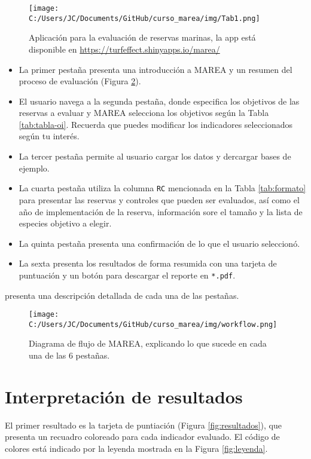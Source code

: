 \documentclass[]{krantz}
\providecommand{\tightlist}{%
  \setlength{\itemsep}{0pt}\setlength{\parskip}{0pt}}
\begin{document}
\begin{figure}
\centering
\texttt{[image: C:/Users/JC/Documents/GitHub/curso\_marea/img/Tab1.png]}
\caption{\label{fig:shiny-marea}Aplicación para la evaluación de reservas
marinas, la app está disponible en
\url{https://turfeffect.shinyapps.io/marea/}}
\end{figure}

\begin{itemize}
\tightlist
\item
  La primer pestaña presenta una introducción a MAREA y un resumen del
  proceso de evaluación (Figura \ref{fig:workflow}).
\item
  El usuario navega a la segunda pestaña, donde especifica los objetivos
  de las reservas a evaluar y MAREA selecciona los objetivos según la
  Tabla \ref{tab:tabla-oi}. Recuerda que puedes modificar los
  indicadores seleccionados según tu interés.
\item
  La tercer pestaña permite al usuario cargar los datos y dercargar
  bases de ejemplo.
\item
  La cuarta pestaña utiliza la columna \texttt{RC} mencionada en la
  Tabla \ref{tab:formato} para presentar las reservas y controles que
  pueden ser evaluados, así como el año de implementación de la reserva,
  información sore el tamaño y la lista de especies objetivo a elegir.
\item
  La quinta pestaña presenta una confirmación de lo que el usuario
  seleccionó.
\item
  La sexta presenta los resultados de forma resumida con una tarjeta de
  puntuación y un botón para descargar el reporte en \texttt{*.pdf}.
\end{itemize}

\citet{villaseorderbez_2017} presenta una descripción detallada de cada
una de las pestañas.

\begin{figure}
\centering
\texttt{[image: C:/Users/JC/Documents/GitHub/curso\_marea/img/workflow.png]}
\caption{\label{fig:workflow}Diagrama de flujo de MAREA, explicando lo que
sucede en cada una de las 6 pestañas.}
\end{figure}

\hypertarget{interpretacion-de-resultados}{%
\section{Interpretación de
resultados}\label{interpretacion-de-resultados}}

El primer resultado es la tarjeta de puntiación (Figura
\ref{fig:resultados}), que presenta un recuadro coloreado para cada
indicador evaluado. El código de colores está indicado por la leyenda
mostrada en la Figura \ref{fig:leyenda}.
\end{document}
